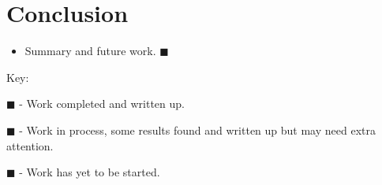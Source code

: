 \documentclass[11pt]{article}
\begin{document}
\section{Conclusion}
\begin{itemize}
\item Summary and future work. {\color{red} $\blacksquare$}
\end{itemize}
\hspace{10mm}

Key:

{\color{green} $\blacksquare$} - Work completed and written up.

{\color{yellow} $\blacksquare$} - Work in process, some results found and written up but may need extra attention.

{\color{red} $\blacksquare$} - Work has yet to be started.
\end{document}

